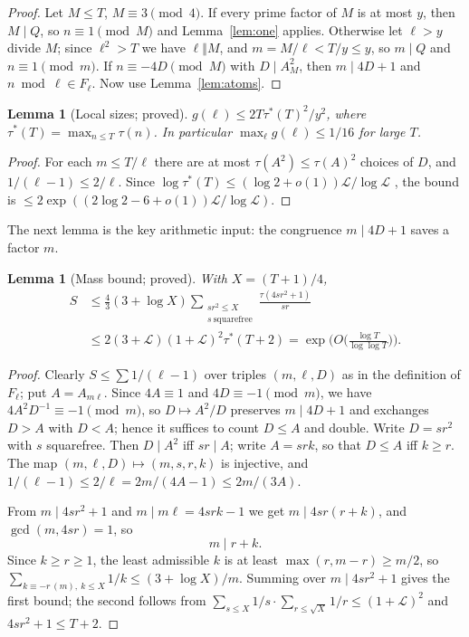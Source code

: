 \documentclass[11pt,reqno]{amsart}
\newtheorem{lemma}[theorem]{Lemma}
\theoremstyle{definition}
\newcommand{\Lc}{\mathcal L}
\begin{document}
\begin{proof}
Let $M\le T$, $M\equiv3\pmod4$.  If every prime factor of $M$ is at most $y$,
then $M\mid Q$, so $n\equiv1\pmod M$ and Lemma~\ref{lem:one} applies.
Otherwise let $\ell>y$ divide $M$; since $\ell^2>T$ we have $\ell\Vert M$, and
$m=M/\ell<T/y\le y$, so $m\mid Q$ and $n\equiv1\pmod m$.  If
$n\equiv-4D\pmod M$ with $D\mid A_M^2$, then $m\mid4D+1$ and
$n\bmod\ell\in F_\ell$.  Now use Lemma~\ref{lem:atoms}.
\end{proof}

\begin{lemma}[Local sizes; proved]\label{lem:sizes}
$g(\ell)\le2T\tau^*(T)^2/y^2$, where $\tau^*(T)=\max_{n\le T}\tau(n)$.  In
particular $\max_\ell g(\ell)\le1/16$ for large $T$.
\end{lemma}

\begin{proof}
For each $m\le T/\ell$ there are at most $\tau(A^2)\le\tau(A)^2$ choices of
$D$, and $1/(\ell-1)\le2/\ell$.  Since $\log\tau^*(T)\le(\log2+o(1))\Lc/\log\Lc$
\cite[Thm.~317]{HW}, the bound is $\le2\exp((2\log2-6+o(1))\Lc/\log\Lc)$.
\end{proof}

The next lemma is the key arithmetic input: the congruence $m\mid4D+1$
saves a factor $m$.

\begin{lemma}[Mass bound; proved]\label{lem:mass}
With $X=(T+1)/4$,
\begin{align*}
 S&\le\tfrac43(3+\log X)\sum_{\substack{sr^2\le X\\ s\ \text{squarefree}}}\frac{\tau(4sr^2+1)}{sr}\\
 &\le 2(3+\Lc)(1+\Lc)^2\tau^*(T+2)=\exp\Big(O\Big(\frac{\log T}{\log\log T}\Big)\Big).
\end{align*}
\end{lemma}

\begin{proof}
Clearly $S\le\sum 1/(\ell-1)$ over triples $(m,\ell,D)$ as in the definition
of $F_\ell$; put $A=A_{m\ell}$.  Since $4A\equiv1$ and $4D\equiv-1\pmod m$, we
have $4A^2D^{-1}\equiv-1\pmod m$, so $D\mapsto A^2/D$ preserves $m\mid4D+1$
and exchanges $D>A$ with $D<A$; hence it suffices to count $D\le A$ and
double.  Write $D=sr^2$ with $s$ squarefree.  Then $D\mid A^2$ iff $sr\mid A$;
write $A=srk$, so that $D\le A$ iff $k\ge r$.  The map
$(m,\ell,D)\mapsto(m,s,r,k)$ is injective, and
$1/(\ell-1)\le2/\ell=2m/(4A-1)\le2m/(3A)$.

From $m\mid4sr^2+1$ and $m\mid m\ell=4srk-1$ we get $m\mid4sr(r+k)$, and
$\gcd(m,4sr)=1$, so
\[
 m\mid r+k .
\]
Since $k\ge r\ge1$, the least admissible $k$ is at least $\max(r,m-r)\ge m/2$,
so $\sum_{k\equiv-r\,(m),\ k\le X}1/k\le(3+\log X)/m$.  Summing over $m\mid4sr^2+1$
gives the first bound; the second follows from $\sum_{s\le X}1/s\cdot\sum_{r\le\sqrt X}1/r\le(1+\Lc)^2$
and $4sr^2+1\le T+2$.
\end{proof}
\end{document}
